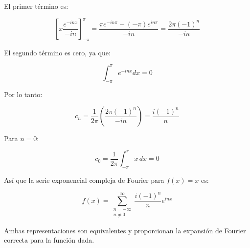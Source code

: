 El primer término es:

\[
\left[ x \frac{e^{-i n x}}{-i n} \right]_{-\pi}^{\pi} = \frac{\pi e^{-i n \pi} - (-\pi) e^{i n \pi}}{-i n} = \frac{2 \pi (-1)^n}{-i n}
\]

El segundo término es cero, ya que:

\[
\int_{-\pi}^{\pi} e^{-i n x} dx = 0
\]

Por lo tanto:

\[
c_n = \frac{1}{2\pi} \left( \frac{2 \pi (-1)^n}{-i n} \right) = \frac{i (-1)^n}{n}
\]

Para \( n = 0 \):

\[
c_0 = \frac{1}{2\pi} \int_{-\pi}^{\pi} x \, dx = 0
\]

Así que la serie exponencial compleja de Fourier para \( f(x) = x \) es:

\[
f(x) = \sum_{\substack{n=-\infty \\ n \neq 0}}^{\infty} \frac{i (-1)^n}{n} e^{i n x}
\]


Ambas representaciones son equivalentes y proporcionan la expansión de Fourier correcta para la función dada.

